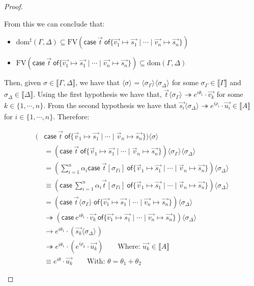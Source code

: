 \documentclass[runningheads,orivec]{llncs}
\newcommand\ansubst[2]{\ensuremath{\langle #1 \rangle_{#2}}}
\newcommand\dom[1]{\mathrm{dom}(#1)}
\newcommand\sdom[1]{\mathrm{dom}^{\sharp}(#1)}
\newcommand\FV[1]{\mathrm{FV}(#1)}
\def\gencase#1#2#3#4#5{\ensuremath{\mathsf{case}~#1~\mathsf{of} \{#2\mapsto #4 \mid \dotsb \mid #3\mapsto #5\}}}
\def\evalone{\rightarrow}
\def\eval{\twoheadrightarrow}
\def\sem#1{\llbracket#1\rrbracket}
\begin{document}
\begin{proof}
\begin{description}
    From this we can conclude that:
    
    \begin{itemize}
        \item $\sdom{\Gamma,\Delta}\subseteq \FV{\gencase{\vec{t}}{\vec{v_1}}{\vec {v_n}}{\vec{s_1}}{\vec{s_n}}}$
        \item $\FV{\gencase{\vec{t}}{\vec{v_1}}{\vec {v_n}}{\vec{s_1}}{\vec{s_n}}}\subseteq \dom{\Gamma,\Delta}$
    \end{itemize}


    
    Then, given $\sigma\in\sem{\Gamma,\Delta}$, we have that $\ansubst{\sigma}{}=\ansubst{\sigma_\Gamma}{}\ansubst{\sigma_\Delta}{}$ for some $\sigma_\Gamma\in\sem{\Gamma}$ and $\sigma_\Delta\in\sem{\Delta}$. Using the first hypothesis we have that, $\vec{t}\ansubst{\sigma_\Gamma}{}\eval e^{i\theta_1}\cdot\vec{v_k}$ for some $k\in\{1,\dotsb ,n\}$. From the second hypothesis we have that $\vec{s_i}\ansubst{\sigma_\Delta}{}\eval e^{i\rho_i}\cdot\vec{u_i}\in\sem{A}$ for $i\in\{1,\dotsb , n\}$. Therefore:

    \begin{align*}
        (&\gencase{\vec{t}}{\vec v_1}{\vec v_n}{\vec{s_1}}{\vec{s_n}})\ansubst{\sigma}{}\\ 
        &= (\gencase{\vec{t}}{\vec v_1}{\vec v_n}{\vec{s_1}}{\vec{s_n}})\ansubst{\sigma_\Gamma}{}\ansubst{\sigma_\Delta}{}\\
        &= (\sum_{i=1}^{n}\alpha_i \gencase{\vec{t}[\sigma_{\Gamma i}]}{\vec v_1}{\vec v_n}{\vec{s_1}}{\vec{s_n}})\ansubst{\sigma_\Delta}{} \\
        &\equiv (\gencase{\sum_{i=1}^{n} \alpha_i \vec{t}[\sigma_{\Gamma i}]}{\vec v_1}{\vec v_n}{\vec{s_1}}{\vec{s_n}})\ansubst{\sigma_\Delta}{}\\
        &=(\gencase{\vec{t}\ansubst{\sigma_\Gamma}{}}{\vec{v_1}}{\vec{v_n}}{\vec{s_1}}{\vec{s_n}})\ansubst{\sigma_\Delta}{}\\
        &\eval(\gencase{e^{i\theta_1}\cdot\vec{v_k}}{\vec{v_1}}{\vec{v_n}}{\vec{s_1}}{\vec{s_n}})\ansubst{\sigma_\Delta}{}\\
        &\evalone e^{i\theta_1}\cdot(\vec{s_k}\ansubst{\sigma_\Delta}{})\\
        &\eval e^{i\theta_1}\cdot(e^{i\rho_k}\cdot\vec{u_k})\qquad\text{Where: }\vec{u_k}\in\sem{A}\\
        &\equiv e^{i\theta}\cdot\vec{u_k}\qquad\text{With: }\theta=\theta_1 +\theta_2
    \end{align*}
    

\end{description}
\end{proof}
\end{document}
